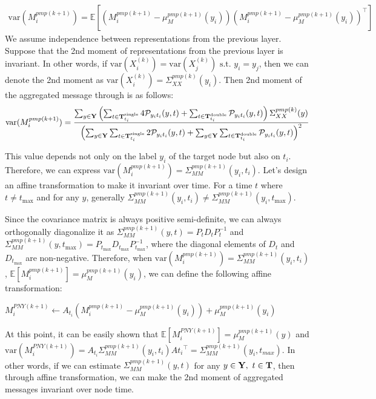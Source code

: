 \begin{align}
\text{var}(M_{i}^{pmp(k+1)})=\mathbb{E}\left[(M_i ^{pmp (k+1)}-\mu_{M}^{pmp(k+1)}(y_i))(M_i ^{pmp (k+1)}-\mu_{M}^{pmp(k+1)}(y_i))^{\top}\right]
\end{align}
We assume independence between representations from the previous layer. Suppose that the 2nd moment of representations from the previous layer is invariant. In other words, if $\text{var}(X_i^{(k)})=\text{var}(X_j^{(k)})\text{ s.t. }y_i=y_j$, then we can denote the 2nd moment as $\text{var}(X_i^{(k)})=\Sigma_{XX}^{pmp(k)}(y_i)$. Then 2nd moment of the aggregated message through \PMP is as follows: 
\begin{align}
\text{var}(M_{i}^{pmp(k+1)}) = {\sum_{y\in \bold{Y}}\left(\sum_{t\in\bold{T}_{t_i}^{\text{single}}}4\mathcal{P}_{y_i t_i}(y, t)+\sum_{t\in\bold{T}_{t_i}^{\text{double}}}\mathcal{P}_{y_i t_i}(y, t)\right)\Sigma_{XX}^{pmp(k)}(y)
\over
\left(\sum_{y\in \bold{Y}}\sum_{t\in\bold{T}_{t_i}^{\text{single}}}2\mathcal{P}_{y_i t_i}(y, t)+\sum_{y\in \bold{Y}}\sum_{t\in\bold{T}_{t_i}^{\text{double}}}\mathcal{P}_{y_i t_i}(y, t)\right)^2}
\end{align}

This value depends not only on the label $y_i$ of the target node but also on $t_i$. Therefore, we can express $\text{var}(M_{i}^{pmp(k+1)})=\Sigma^{pmp(k+1)}_{MM}(y_i,t_i)$. Let's design an affine transformation to make it invariant over time. For a time $t$ where $t \neq t_{\text{max}}$ and for any $y$, generally $\Sigma^{pmp(k+1)}_{MM}(y_i,t_i)\neq\Sigma^{pmp(k+1)}_{MM}(y_i,t_{\text{max}})$.

Since the covariance matrix is always positive semi-definite, we can always orthogonally diagonalize it as $\Sigma^{pmp(k+1)}_{MM}(y,t)=P_tD_t P_t^{-1}$ and $\Sigma^{pmp(k+1)}_{MM}(y,t_{\text{max}})=P_{t_{\text{max}}}D_{t_{\text{max}}} P_{t_{\text{max}}}^{-1}$, where the diagonal elements of $D_{t}$ and $D_{t_{\text{max}}}$ are non-negative. Therefore, when $\text{var}(M_i^{pmp (k+1)})=\Sigma^{pmp(k+1)}_{MM}(y_i,t_i)$, $\mathbb E[M_i^{pmp(k+1)}]=\mu_M^{pmp (k+1)}({y_i})$, we can define the following affine transformation:

$M_{i}^{PNY(k+1)}\leftarrow A_{t_i} (M_i^{pmp(k+1)}-\mu_{M}^{pmp(k+1)}(y_i))+\mu_{M}^{pmp(k+1)}(y_i)$

At this point, it can be easily shown that $\mathbb{E}[M_{i}^{PNY(k+1)}]=\mu_{M}^{pmp(k+1)}(y)$ and $\text{var}(M_{i}^{PNY(k+1)})=A_{t_i}\Sigma^{pmp(k+1)}_{MM}(y_i,t_i)A{t_i}^{\top} = \Sigma^{pmp(k+1)}_{MM}(y_i,t_{max})$. In other words, if we can estimate $\Sigma^{pmp(k+1)}_{MM}(y,t)$ for any $y\in \bold{Y}, \ t\in \bold{T}$, then through affine transformation, we can make the 2nd moment of aggregated messages invariant over node time.


